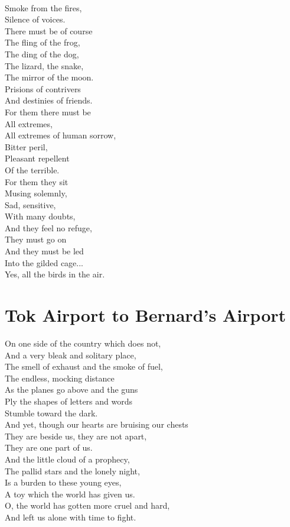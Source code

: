 \documentclass[smalldemyvopaper,11pt,twoside,onecolumn,openright,extrafontsizes]{memoir}
\begin{document}
\\Smoke from the fires,
\\Silence of voices.
\\There must be of course
\\The fling of the frog,
\\The ding of the dog,
\\The lizard, the snake,
\\The mirror of the moon.
\\Prisions of contrivers
\\And destinies of friends.
\\For them there must be
\\All extremes,
\\All extremes of human sorrow,
\\Bitter peril,
\\Pleasant repellent
\\Of the terrible.
\\For them they sit
\\Musing solemnly,
\\Sad, sensitive,
\\With many doubts,
\\And they feel no refuge,
\\They must go on
\\And they must be led
\\Into the gilded cage...
\\Yes, all the birds in the air.



\chapter{Tok Airport to Bernard's Airport}
On one side of the country which does not,
\\And a very bleak and solitary place,
\\The smell of exhaust and the smoke of fuel,
\\The endless, mocking distance
\\As the planes go above and the guns
\\Ply the shapes of letters and words
\\Stumble toward the dark.
\\And yet, though our hearts are bruising our chests
\\They are beside us, they are not apart,
\\They are one part of us.
\\And the little cloud of a prophecy,
\\The pallid stars and the lonely night,
\\Is a burden to these young eyes,
\\A toy which the world has given us.
\\O, the world has gotten more cruel and hard,
\\And left us alone with time to fight.
\end{document}
